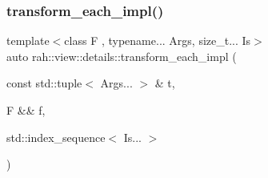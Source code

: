 \mbox{\label{namespacerah_1_1view_1_1details_aa19b6b37a888a1c2a04e27766baa84cc}} 
\subsubsection{\texorpdfstring{transform\_each\_impl()}{transform\_each\_impl()}}
{\footnotesize\ttfamily template$<$class F , typename... Args, size\+\_\+t... Is$>$ \\
auto rah\+::view\+::details\+::transform\+\_\+each\+\_\+impl (\begin{DoxyParamCaption}\item[{const std\+::tuple$<$ Args... $>$ \&}]{t,  }\item[{F \&\&}]{f,  }\item[{std\+::index\+\_\+sequence$<$ Is... $>$}]{ }\end{DoxyParamCaption})}

